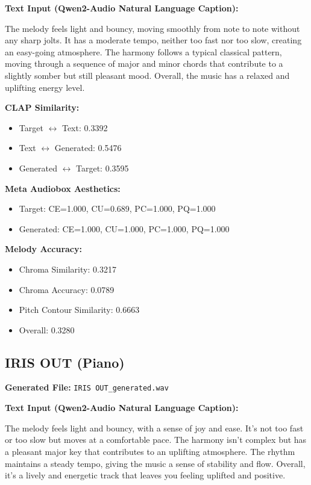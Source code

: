 \documentclass{article}
\begin{document}
\begin{CJK}{UTF8}{bsmi}
\textbf{Text Input (Qwen2-Audio Natural Language Caption):}

\small
The melody feels light and bouncy, moving smoothly from note to note without any sharp jolts. It has a moderate tempo, neither too fast nor too slow, creating an easy-going atmosphere. The harmony follows a typical classical pattern, moving through a sequence of major and minor chords that contribute to a slightly somber but still pleasant mood. Overall, the music has a relaxed and uplifting energy level.
\normalsize

\textbf{CLAP Similarity:}
\begin{itemize}
    \item Target $\leftrightarrow$ Text: 0.3392
    \item Text $\leftrightarrow$ Generated: 0.5476
    \item Generated $\leftrightarrow$ Target: 0.3595
\end{itemize}

\textbf{Meta Audiobox Aesthetics:}
\begin{itemize}
    \item Target: CE=1.000, CU=0.689, PC=1.000, PQ=1.000
    \item Generated: CE=1.000, CU=1.000, PC=1.000, PQ=1.000
\end{itemize}

\textbf{Melody Accuracy:}
\begin{itemize}
    \item Chroma Similarity: 0.3217
    \item Chroma Accuracy: 0.0789
    \item Pitch Contour Similarity: 0.6663
    \item Overall: 0.3280
\end{itemize}

\subsection{IRIS OUT (Piano)}

\textbf{Generated File:} \texttt{IRIS OUT\_generated.wav}

\textbf{Text Input (Qwen2-Audio Natural Language Caption):}

\small
The melody feels light and bouncy, with a sense of joy and ease. It's not too fast or too slow but moves at a comfortable pace. The harmony isn't complex but has a pleasant major key that contributes to an uplifting atmosphere. The rhythm maintains a steady tempo, giving the music a sense of stability and flow. Overall, it's a lively and energetic track that leaves you feeling uplifted and positive.
\normalsize


\end{CJK}
\end{document}
